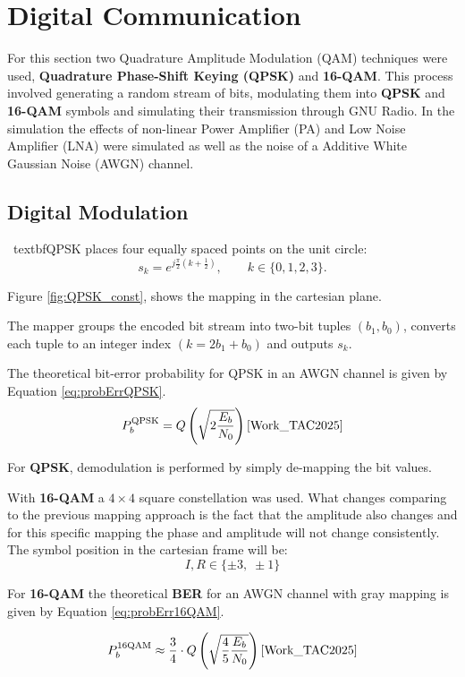 
\section{Digital Communication}

For this section two Quadrature Amplitude Modulation (QAM) techniques were used, \textbf{Quadrature Phase-Shift Keying (QPSK)} and \textbf{16-QAM}. This process involved generating a random stream of bits, modulating them into \textbf{QPSK} and \textbf{16-QAM} symbols and simulating their transmission through GNU Radio. In the simulation the effects of non-linear Power Amplifier (PA) and Low Noise Amplifier (LNA) were simulated as well as the noise of a Additive White Gaussian Noise (AWGN) channel.

\subsection{Digital Modulation}

\label{ssec:modulations}
\
textbf{QPSK} places four equally spaced points on the unit circle:
\[
s_k = e^{j\frac{\pi}{2}\left(k+\tfrac12\right)}, \qquad k\in\{0,1,2,3\}.
\]

Figure \ref{fig:QPSK_const}, shows the mapping in the cartesian plane.


The mapper groups the encoded bit stream into two-bit tuples $(b_1,b_0)$, converts each tuple to an integer index $(k =2b_1+b_0)$ and outputs \(s_k\).

The theoretical bit-error probability for QPSK in an AWGN channel is given by Equation \ref{eq:probErrQPSK}.
\begin{equation}
  P_b^{\text{QPSK}} = Q\left(\sqrt{2\frac{E_b}{N_0}}\right)\text{\cite{Work_TAC2025}}
  \label{eq:probErrQPSK}
\end{equation}

For \textbf{QPSK}, demodulation is performed by simply de-mapping the bit values.


With \textbf{16-QAM} a $4\times4$ square constellation was used. What changes comparing to the previous mapping approach is the fact that the amplitude also changes and for this specific mapping the phase and amplitude will not change consistently. The symbol position in the cartesian frame will be:
\[
I,R \in \{\pm3,\;\pm1\}
\]

For \textbf{16-QAM} the theoretical \textbf{BER} for an AWGN channel with gray mapping is given by Equation \ref{eq:probErr16QAM}.

\begin{equation}
  P_b^{\text{16QAM}} \approx \frac{3}{4}\cdot Q\left(\sqrt{\frac{4}{5}\frac{E_b}{N_0}}\right)\text{\cite{Work_TAC2025}}
  \label{eq:probErr16QAM}
\end{equation}



